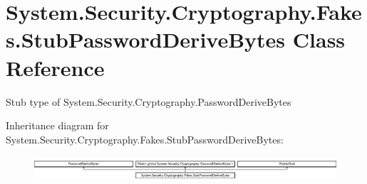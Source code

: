 \hypertarget{class_system_1_1_security_1_1_cryptography_1_1_fakes_1_1_stub_password_derive_bytes}{\section{System.\-Security.\-Cryptography.\-Fakes.\-Stub\-Password\-Derive\-Bytes Class Reference}
\label{class_system_1_1_security_1_1_cryptography_1_1_fakes_1_1_stub_password_derive_bytes}
}


Stub type of System.\-Security.\-Cryptography.\-Password\-Derive\-Bytes 


Inheritance diagram for System.\-Security.\-Cryptography.\-Fakes.\-Stub\-Password\-Derive\-Bytes\-:\begin{figure}[H]
\begin{center}
\leavevmode
\includegraphics[height=0.908354cm]{class_system_1_1_security_1_1_cryptography_1_1_fakes_1_1_stub_password_derive_bytes}
\end{center}
\end{figure}
